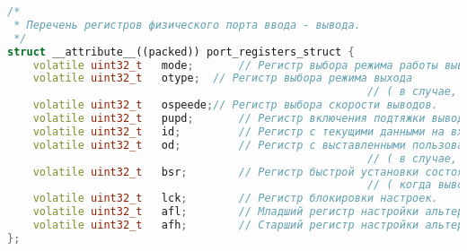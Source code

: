 \begin{lstlisting}[language=C++, frame=tlBR, basicstyle=\fontsize{10}{10}\ttfamily]
/*
 * Перечень регистров физического порта ввода - вывода.
 */
struct __attribute__((packed)) port_registers_struct {
	volatile uint32_t	mode;		// Регистр выбора режима работы выводов.
	volatile uint32_t	otype;	// Регистр выбора режима выхода 
														// ( в случае, если вывод настроен как выход ).
	volatile uint32_t	ospeede;// Регистр выбора скорости выводов.
	volatile uint32_t	pupd;		// Регистр включения подтяжки выводов.
	volatile uint32_t	id;			// Регистр с текущими данными на входе вывода.
	volatile uint32_t	od;			// Регистр с выставленными пользователем на выход данными
														// ( в случае, если вывод настроен как выход ).
	volatile uint32_t	bsr;		// Регистр быстрой установки состояния выводов
														// ( когда вывод настроен как выход ).
	volatile uint32_t	lck;		// Регистр блокировки настроек.
	volatile uint32_t	afl;		// Младший регистр настройки альтернативных функций выводов.
	volatile uint32_t	afh;		// Старший регистр настройки альтернативных функций выводов.
};\end{lstlisting}